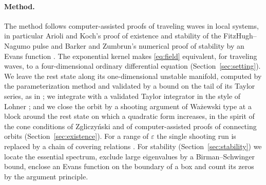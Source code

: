 \documentclass[11pt]{article}
\theoremstyle{definition}
\newcommand{\eps}{\varepsilon}
\begin{document}
\paragraph{Method.} The method follows computer-assisted proofs of traveling waves in local systems, in particular Arioli and Koch's proof of existence and stability of the FitzHugh--Nagumo pulse \cite{ak2015} and Barker and Zumbrun's numerical proof of stability by an Evans function \cite{bz2016}. The exponential kernel makes \eqref{eq:field} equivalent, for traveling waves, to a four-dimensional ordinary differential equation (Section~\ref{sec:setting}). We leave the rest state along its one-dimensional unstable manifold, computed by the parameterization method \cite{cfl2003} and validated by a bound on the tail of its Taylor series, as in \cite{bmlm2011}; we integrate with a validated Taylor integrator in the style of Lohner \cite{lohner1987,tucker2011}; and we close the orbit by a shooting argument of Wa\.zewski type \cite{wazewski1947,conley1978} at a block around the rest state on which a quadratic form increases, in the spirit of the cone conditions of Zgliczy\'nski \cite{z2009} and of computer-assisted proofs of connecting orbits \cite{wz2003,capd2021} (Section~\ref{sec:existence}). For a range of $\eps$ the single shooting run is replaced by a chain of covering relations \cite{zg2004}. For stability (Section~\ref{sec:stability}) we locate the essential spectrum, exclude large eigenvalues by a Birman--Schwinger bound, enclose an Evans function \cite{agj1990,kp2013} on the boundary of a box and count its zeros by the argument principle.
\end{document}
